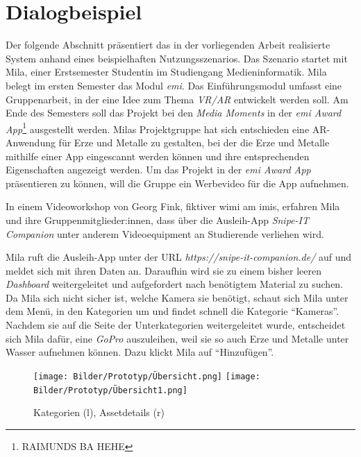 \chapter{Dialogbeispiel}
\label{chapter-dialogbeispiel}

Der folgende Abschnitt präsentiert das in der vorliegenden Arbeit realisierte
System anhand eines beispielhaften Nutzungsszenarios. Das Szenario startet mit
Mila, einer Erstsemester Studentin im Studiengang Medieninformatik. Mila belegt
im ersten Semester das Modul \textit{\ac{emi}}. Das Einführungsmodul umfasst
eine Gruppenarbeit, in der eine Idee  zum Thema \textit{VR/AR} entwickelt werden
soll. Am Ende des Semesters soll das Projekt bei den \textit{Media Moments} in
der \textit{\ac{emi} Award App}\footnote{RAIMUNDS BA HEHE} ausgestellt werden.
Milas Projektgruppe hat sich entschieden eine AR-Anwendung für Erze und Metalle
zu gestalten, bei der die Erze und Metalle mithilfe einer App eingescannt werden
können und ihre entsprechenden Eigenschaften angezeigt werden. Um das Projekt in
der \textit{\ac{emi} Award App} präsentieren zu können, will die Gruppe ein
Werbevideo für die App aufnehmen.

In einem Videoworkshop von Georg Fink, fiktiver \ac{wimi} am \ac{imis}, erfahren
Mila und ihre Gruppenmitglieder:innen, dass über die Ausleih-App
\textit{Snipe-IT Companion} unter anderem Videoequipment an Studierende
verliehen wird.

Mila ruft die Ausleih-App unter der URL \textit{https://snipe-it-companion.de/}
auf und meldet sich mit ihren  Daten an. Daraufhin wird sie zu einem
bisher leeren \textit{Dashboard} weitergeleitet und aufgefordert nach benötigtem
Material zu suchen. Da Mila sich nicht sicher ist, welche Kamera sie benötigt,
schaut sich Mila unter dem Menü, in den Kategorien um und findet schnell die
Kategorie \enquote{Kameras}. Nachdem sie auf die Seite der Unterkategorien
weitergeleitet wurde, entscheidet sich Mila dafür, eine \textit{GoPro}
auszuleihen, weil sie so auch Erze und Metalle unter Wasser aufnehmen können.
Dazu klickt Mila auf \enquote{Hinzufügen}.

\begin{figure}[h]
    \centering
    \texttt{[image: Bilder/Prototyp/Übersicht.png]}\hspace{2em}
    \texttt{[image: Bilder/Prototyp/Übersicht1.png]}
    \label{fig:p4}
    \caption[Mockup: Kategorien, Assets, Assetdetails]{Kategorien (l), Assetdetails (r)}
\end{figure}


